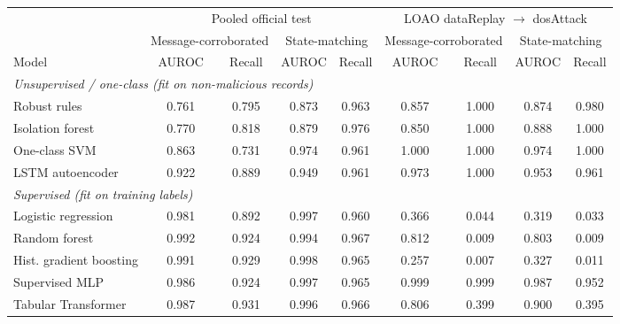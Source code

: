 \begin{tabular}{lcccccccc}
\toprule
& \multicolumn{4}{c}{Pooled official test} & \multicolumn{4}{c}{LOAO dataReplay $\rightarrow$ dosAttack} \\
\cmidrule(lr){2-5}\cmidrule(lr){6-9}
& \multicolumn{2}{c}{Message-corroborated} & \multicolumn{2}{c}{State-matching} & \multicolumn{2}{c}{Message-corroborated} & \multicolumn{2}{c}{State-matching} \\
\cmidrule(lr){2-3}\cmidrule(lr){4-5}\cmidrule(lr){6-7}\cmidrule(lr){8-9}
Model & AUROC & Recall & AUROC & Recall & AUROC & Recall & AUROC & Recall \\
\midrule
\multicolumn{9}{l}{\textit{Unsupervised / one-class (fit on non-malicious records)}} \\
Robust rules & 0.761 & 0.795 & 0.873 & 0.963 & 0.857 & 1.000 & 0.874 & 0.980 \\
Isolation forest & 0.770 & 0.818 & 0.879 & 0.976 & 0.850 & 1.000 & 0.888 & 1.000 \\
One-class SVM & 0.863 & 0.731 & 0.974 & 0.961 & 1.000 & 1.000 & 0.974 & 1.000 \\
LSTM autoencoder & 0.922 & 0.889 & 0.949 & 0.961 & 0.973 & 1.000 & 0.953 & 0.961 \\
\midrule
\multicolumn{9}{l}{\textit{Supervised (fit on training labels)}} \\
Logistic regression & 0.981 & 0.892 & 0.997 & 0.960 & 0.366 & 0.044 & 0.319 & 0.033 \\
Random forest & 0.992 & 0.924 & 0.994 & 0.967 & 0.812 & 0.009 & 0.803 & 0.009 \\
Hist. gradient boosting & 0.991 & 0.929 & 0.998 & 0.965 & 0.257 & 0.007 & 0.327 & 0.011 \\
Supervised MLP & 0.986 & 0.924 & 0.997 & 0.965 & 0.999 & 0.999 & 0.987 & 0.952 \\
Tabular Transformer & 0.987 & 0.931 & 0.996 & 0.966 & 0.806 & 0.399 & 0.900 & 0.395 \\
\bottomrule
\end{tabular}
